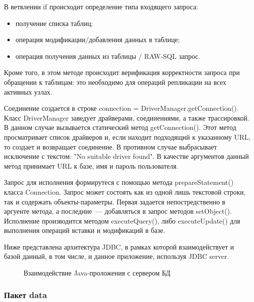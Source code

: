 В ветвлении if происходит определение типа входящего запроса:
\begin{itemize}
\item получение списка таблиц;
\item операция модификации/добавления данных в таблице;
\item операция получения данных из таблицы / RAW-SQL запрос.
\end{itemize}
Кроме того, в этом методе происходит верификация корректности запроса при обращении к таблицам: это необходимо для операций репликации на всех активных узлах.

Соединение создается в строке connection = DriverManager.getConnection(). Класс DriverManager заведует драйверами, соединениями, а также трассировкой. В данном случае вызывается статический метод getConnection(). Этот метод просматривает список драйверов и, если находит подходящий к указанному URL, то создает и возвращает соединение. В противном случае выбрасывает исключение с текстом: "No suitable driver found". В качестве аргументов данный метод принимает URL к базе, имя и пароль пользователя.

Запрос для исполнения формирутеся с помощью метода prepareStatement() класса Connection. Запрос может состоять как из одной лишь текстовой строки, так и содержать объекты-параметры. Первая задается непостредственно в аргуенте метода, а последние~--- добавляться в запрос методов setObject(). Исполнение производится методом executeQuery(), либо executeUpdate() для выполнения операций вставки и модификаций в базе.

Ниже представлена архитектура JDBC, в рамках которой взаимодействует и базой данный, в том числе, и данное приложение, используя JDBC server.
\begin{figure}[h]
\caption{Взаимодействие Java-проложения с сервером БД}
\label{3:jdbc}
\end{figure}

\subsubsection{Пакет data}

